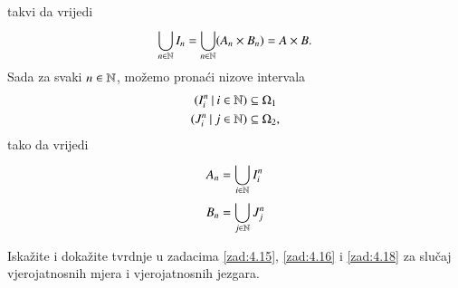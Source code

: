 \begin{rj}[\ref{zad:4.18}]
\begin{enumerate}[label=(\roman*)]
\begin{equation*}
\begin{aligned}
                \end{aligned}
            \end{equation*}
            takvi da vrijedi
            \begin{equation*}
                \bigcup\limits_{n \in \mathbb{N}}^{} I_n = \bigcup\limits_{n \in \mathbb{N}}^{} (A_n \times B_n) = A \times B.
            \end{equation*}
            Sada za svaki $n \in \mathbb{N}$, mo\v zemo prona\' ci nizove intervala
            \begin{equation*}
                \begin{aligned}
                    ({I^n_i} \: | \: {i \in \mathbb{N}}) &\subseteq \Omega_1\\
                    ({J^n_i} \: | \: {j \in \mathbb{N}}) &\subseteq \Omega_2,
                \end{aligned}
            \end{equation*}
            tako da vrijedi
            \begin{equation*}
                \begin{aligned}
                    A_n &= \bigcup\limits_{i \in \mathbb{N}}^{} I^n_i\\
                    B_n &= \bigcup\limits_{j \in \mathbb{N}}^{} J^n_j
                \end{aligned}
            \end{equation*}
    \end{enumerate}
\end{rj}
\fi

\begin{zad} \label{zad:4.19}
    Iska\v zite i doka\v zite tvrdnje u zadacima \ref{zad:4.15}, \ref{zad:4.16} i \ref{zad:4.18} za slu\v caj vjerojatnosnih mjera i vjerojatnosnih jezgara.
\end{zad}

